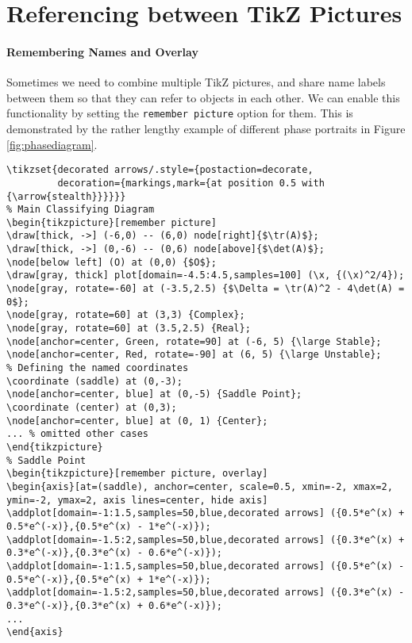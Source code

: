 \section{Referencing between TikZ Pictures}

\paragraph{Remembering Names and Overlay}
Sometimes we need to combine multiple TikZ pictures, and share name labels between them so that they can refer to objects in each other. We can enable this functionality by setting the \texttt{remember picture} option for them. This is demonstrated by the rather lengthy example of different phase portraits in Figure \ref{fig:phasediagram}.
\begin{lstlisting}
\tikzset{decorated arrows/.style={postaction=decorate,
         decoration={markings,mark={at position 0.5 with {\arrow{stealth}}}}}}
% Main Classifying Diagram
\begin{tikzpicture}[remember picture]
\draw[thick, ->] (-6,0) -- (6,0) node[right]{$\tr(A)$};
\draw[thick, ->] (0,-6) -- (0,6) node[above]{$\det(A)$};
\node[below left] (O) at (0,0) {$O$}; 
\draw[gray, thick] plot[domain=-4.5:4.5,samples=100] (\x, {(\x)^2/4});
\node[gray, rotate=-60] at (-3.5,2.5) {$\Delta = \tr(A)^2 - 4\det(A) = 0$};
\node[gray, rotate=60] at (3,3) {Complex};
\node[gray, rotate=60] at (3.5,2.5) {Real};
\node[anchor=center, Green, rotate=90] at (-6, 5) {\large Stable};
\node[anchor=center, Red, rotate=-90] at (6, 5) {\large Unstable};
% Defining the named coordinates
\coordinate (saddle) at (0,-3);
\node[anchor=center, blue] at (0,-5) {Saddle Point};
\coordinate (center) at (0,3);
\node[anchor=center, blue] at (0, 1) {Center};
... % omitted other cases
\end{tikzpicture} 
% Saddle Point
\begin{tikzpicture}[remember picture, overlay]
\begin{axis}[at=(saddle), anchor=center, scale=0.5, xmin=-2, xmax=2, ymin=-2, ymax=2, axis lines=center, hide axis]
\addplot[domain=-1:1.5,samples=50,blue,decorated arrows] ({0.5*e^(x) + 0.5*e^(-x)},{0.5*e^(x) - 1*e^(-x)});
\addplot[domain=-1.5:2,samples=50,blue,decorated arrows] ({0.3*e^(x) + 0.3*e^(-x)},{0.3*e^(x) - 0.6*e^(-x)});
\addplot[domain=-1:1.5,samples=50,blue,decorated arrows] ({0.5*e^(x) - 0.5*e^(-x)},{0.5*e^(x) + 1*e^(-x)});
\addplot[domain=-1.5:2,samples=50,blue,decorated arrows] ({0.3*e^(x) - 0.3*e^(-x)},{0.3*e^(x) + 0.6*e^(-x)});
...
\end{axis}

\end{lstlisting}

